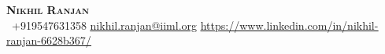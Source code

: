 \begin{center}
    \textbf{\huge \scshape Nikhil Ranjan} \\ \vspace{-2pt}
     \ \small +919547631358 \quad
    \href{mailto:nikhil.ranjan@iiml.org}{ \underline{nikhil.ranjan@iiml.org}} \quad
    \href{https://www.linkedin.com/in/nikhil-ranjan-6628b367/}{ \underline{https://www.linkedin.com/in/nikhil-ranjan-6628b367/}} 
\end{center}